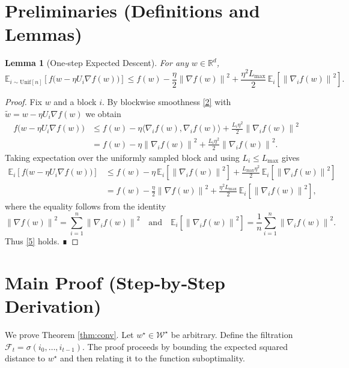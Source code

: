 \documentclass[11pt]{article}
\newtheorem{lemma}{Lemma}
\newcommand{\E}{\mathbb{E}}
\newcommand{\R}{\mathbb{R}}
\newcommand{\norm}[1]{\left\|#1\right\|}
\newcommand{\inner}[2]{\langle #1,#2\rangle}
\begin{document}
\section*{Preliminaries (Definitions and Lemmas)}
\begin{lemma}[One‑step Expected Descent]\label{lem:descent}
For any $w\in\R^{d}$,
\[
\E_{i\sim\text{Unif}[n]}\!\left[f\bigl(w-\eta U_{i}\nabla f(w)\bigr)\right]
\le
f(w)-\frac{\eta}{2}\norm{\nabla f(w)}^{2}
+\frac{\eta^{2}L_{\max}}{2}\,\E_{i}\!\left[\norm{\nabla_{i}f(w)}^{2}\right].
\tag{5}
\]
\end{lemma}
\begin{proof}
Fix $w$ and a block $i$. By blockwise smoothness \eqref{2} with
$\tilde w=w-\eta U_{i}\nabla f(w)$ we obtain
\[
\begin{aligned}
f\bigl(w-\eta U_{i}\nabla f(w)\bigr)
&\le f(w)-\eta\inner{\nabla_{i}f(w)}{\nabla_{i}f(w)}
      +\frac{L_{i}\eta^{2}}{2}\norm{\nabla_{i}f(w)}^{2}\\
&= f(w)-\eta\norm{\nabla_{i}f(w)}^{2}
   +\frac{L_{i}\eta^{2}}{2}\norm{\nabla_{i}f(w)}^{2}.
\end{aligned}
\tag{6}
\]
Taking expectation over the uniformly sampled block and using
$L_{i}\le L_{\max}$ gives
\[
\begin{aligned}
\E_{i}\!\left[f\bigl(w-\eta U_{i}\nabla f(w)\bigr)\right]
&\le f(w)-\eta\,\E_{i}\!\left[\norm{\nabla_{i}f(w)}^{2}\right]
   +\frac{L_{\max}\eta^{2}}{2}\,\E_{i}\!\left[\norm{\nabla_{i}f(w)}^{2}\right]\\
&= f(w)-\frac{\eta}{2}\norm{\nabla f(w)}^{2}
   +\frac{\eta^{2}L_{\max}}{2}\,\E_{i}\!\left[\norm{\nabla_{i}f(w)}^{2}\right],
\end{aligned}
\tag{7}
\]
where the equality follows from the identity
\[
\norm{\nabla f(w)}^{2}= \sum_{i=1}^{n}\norm{\nabla_{i}f(w)}^{2}
\quad\text{and}\quad
\E_{i}\!\left[\norm{\nabla_{i}f(w)}^{2}\right]=\frac{1}{n}\sum_{i=1}^{n}\norm{\nabla_{i}f(w)}^{2}.
\]
Thus \eqref{5} holds. ∎
\end{proof}

\section*{Main Proof (Step‑by‑Step Derivation)}
We prove Theorem \ref{thm:conv}. Let $w^{\star}\in\mathcal{W}^{\star}$ be arbitrary.
Define the filtration $\mathcal{F}_{t}=\sigma(i_{0},\dots ,i_{t-1})$.
The proof proceeds by bounding the expected squared distance to $w^{\star}$
and then relating it to the function suboptimality.
\end{document}
